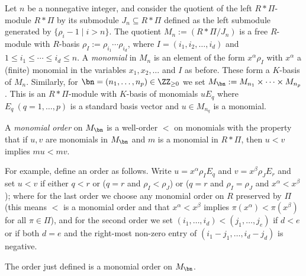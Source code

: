 \documentclass{amsart}
\begin{document}
Let $n$ be a nonnegative integer, and consider the quotient of the
left $R*\Pi$-module $R*\Pi$ by its submodule $J_n \subseteq R*\Pi$
defined as the left submodule generated by $\{\rho_i-1 \mid i>n\}$.
The quotient $M_n:=(R*\Pi/J_n)$ is a free $R$-module with $R$-basis
$\rho_I:=\rho_{i_1} \cdots \rho_{i_d}$, where $I=(i_1,i_2,\ldots,i_d)$
and $1 \leq i_1 \leq \cdots \leq i_d \leq n$. A {\em monomial} in $M_n$
is an element of the form $x^\alpha \rho_I$ with $x^\alpha$ a (finite)
monomial in the variables $x_1,x_2,\ldots$ and $I$ as before. These
form a $K$-basis of $M_n$. Similarly, for $\bn=(n_1,\ldots,n_p) \in
\ZZ_{\geq 0}$ we set $M_{\bn}:=M_{n_1} \times \cdots \times M_{n_p}$.
This is an $R*\Pi$-module with $K$-basis of monomials $uE_q$ where
$E_q\ (q=1,\ldots,p)$ is a standard basis vector and $u \in M_{n_q}$
is a monomial.

\begin{de}
A {\em monomial order} on $M_{\bn}$ is a well-order $<$ on monomials
with the property that if $u,v$ are monomials in $M_\bn$ and $m$ is a
monomial in $R*\Pi$, then $u<v$ implies $mu<mv$.
\end{de}

For example, define an order as follows. Write $u=x^\alpha \rho_I E_q$
and $v=x^\beta \rho_J E_r$ and set $u<v$ if either $q<r$ or ($q=r$ and
$\rho_I<\rho_J$) or ($q=r$ and $\rho_I=\rho_J$ and $x^\alpha < x^\beta$);
where for the last order we choose any monomial order on $R$ preserved by
$\Pi$ (this means $<$ is a monomial order and that $x^\alpha < x^\beta$
implies $\pi(x^\alpha)<\pi(x^\beta)$ for all $\pi \in \Pi$), and for the
second order we set $(i_1,\ldots,i_d)<(j_1,\ldots,j_e)$ if $d<e$ or if
both $d=e$ and the right-most non-zero entry of $(i_1-j_1,\ldots,i_d-j_d)$
is negative.

\begin{lm}
The order just defined is a monomial order on $M_{\bn}$. 
\end{lm}
\end{document}
